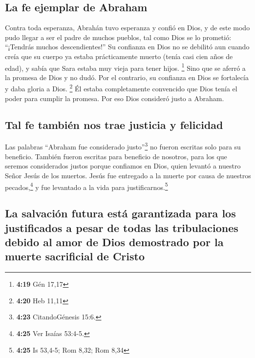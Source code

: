 \hypertarget{la-fe-ejemplar-de-abraham}{%
\subsection{La fe ejemplar de Abraham}\label{la-fe-ejemplar-de-abraham}}

 Contra toda esperanza, Abrahán tuvo esperanza y confió
en Dios, y de este modo pudo llegar a ser el padre de muchos pueblos,
tal como Dios se lo prometió: ``¡Tendrás muchos descendientes!''
 Su confianza en Dios no se debilitó aun cuando creía que
su cuerpo ya estaba prácticamente muerto (tenía casi cien años de edad),
y sabía que Sara estaba muy vieja para tener hijos. \footnote{\textbf{4:19}
  Gén 17,17}  Sino que se aferró a la promesa de Dios y
no dudó. Por el contrario, su confianza en Dios se fortalecía y daba
gloria a Dios. \footnote{\textbf{4:20} Heb 11,11}  Él
estaba completamente convencido que Dios tenía el poder para cumplir la
promesa.  Por eso Dios consideró justo a Abraham.

\hypertarget{tal-fe-tambiuxe9n-nos-trae-justicia-y-felicidad}{%
\subsection{Tal fe también nos trae justicia y
felicidad}\label{tal-fe-tambiuxe9n-nos-trae-justicia-y-felicidad}}

 Las palabras ``Abraham fue considerado
justo''\footnote{\textbf{4:23} CitandoGénesis 15:6.} no fueron escritas
solo para su beneficio.  También fueron escritas para
beneficio de nosotros, para los que seremos considerados justos porque
confiamos en Dios, quien levantó a nuestro Señor Jesús de los muertos.
 Jesús fue entregado a la muerte por causa de nuestros
pecados,\footnote{\textbf{4:25} Ver Isaías 53:4-5.} y fue levantado a la
vida para justificarnos.\footnote{\textbf{4:25} Is 53,4-5; Rom 8,32; Rom
  8,34}

\hypertarget{la-salvaciuxf3n-futura-estuxe1-garantizada-para-los-justificados-a-pesar-de-todas-las-tribulaciones-debido-al-amor-de-dios-demostrado-por-la-muerte-sacrificial-de-cristo}{%
\subsection{La salvación futura está garantizada para los justificados a
pesar de todas las tribulaciones debido al amor de Dios demostrado por
la muerte sacrificial de
Cristo}\label{la-salvaciuxf3n-futura-estuxe1-garantizada-para-los-justificados-a-pesar-de-todas-las-tribulaciones-debido-al-amor-de-dios-demostrado-por-la-muerte-sacrificial-de-cristo}}

